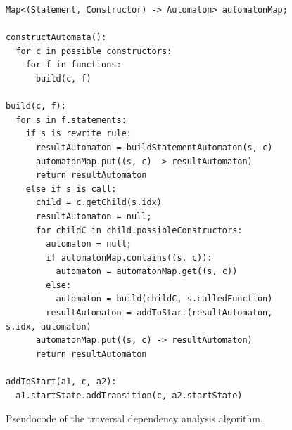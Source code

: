 \begin{figure}
\begin{lstlisting}[style = mystyle_automaton_pseudo]
Map<(Statement, Constructor) -> Automaton> automatonMap;

constructAutomata():
  for c in possible constructors:
    for f in functions:
      build(c, f)

build(c, f):
  for s in f.statements:
    if s is rewrite rule:
      resultAutomaton = buildStatementAutomaton(s, c)
      automatonMap.put((s, c) -> resultAutomaton)
      return resultAutomaton
    else if s is call:
      child = c.getChild(s.idx)
      resultAutomaton = null;
      for childC in child.possibleConstructors:
        automaton = null;
        if automatonMap.contains((s, c)):
          automaton = automatonMap.get((s, c))
        else:
          automaton = build(childC, s.calledFunction)
        resultAutomaton = addToStart(resultAutomaton, s.idx, automaton)
      automatonMap.put((s, c) -> resultAutomaton)
      return resultAutomaton

addToStart(a1, c, a2):
  a1.startState.addTransition(c, a2.startState)
\end{lstlisting}

\caption{Pseudocode of the traversal dependency analysis algorithm.}
\label{fig:traversal-dependency-pseudocode}
\end{figure}




